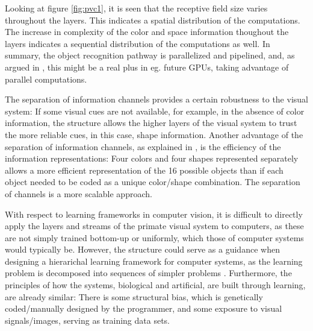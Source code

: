 Looking at figure \ref{fig:pvc1}, it is seen that the receptive field size varies throughout the layers.
This indicates a spatial distribution of the computations.
The increase in complexity of the color and space information thoughout the layers
indicates a sequential distribution of the computations as well. In summary, the object recognition pathway
is parallelized and pipelined, and, as argued in \cite{kruger2013deep},
this might be a real plus in eg. future GPUs, taking advantage of parallel computations.

The separation of information channels provides a certain robustness to the visual system:
If some visual cues are not available, for example, in the absence of color information,
the structure allows the higher layers of the visual system to trust the more reliable cues,
in this case, shape information.
Another advantage of the separation of information channels, as explained in \cite{kruger2013deep},
is the efficiency of the information representations:
Four colors and four shapes represented separately allows a more efficient
representation of the 16 possible objects than if each object needed to be coded as a unique color/shape combination.
The separation of channels is a more scalable approach.

With respect to learning frameworks in computer vision,
it is difficult to directly apply the layers and streams of the primate visual system
to computers, as these are not simply trained bottom-up or uniformly, which those of computer systems would typically be.
However, the structure could serve as a guidance when designing a hierarichal learning framework
for computer systems, as the learning problem is decomposed into sequences of simpler problems \citep{kruger2013deep}.
Furthermore, the principles of how the systems, biological and artificial,
are built through learning, are already similar:
There is some structural bias, which is genetically coded/manually designed by the programmer,
and some exposure to visual signals/images, serving as training data sets.
